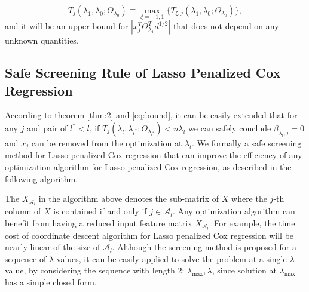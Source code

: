 \begin{equation}
    \label{eq:bound}
    T_j(\lambda_1,\lambda_0;\Theta_{\lambda_0})\equiv\max_{\xi=-1,1}\{T_{\xi,j}(\lambda_1,\lambda_0;\Theta_{\lambda_0})\},
\end{equation}
and it will be an upper bound for $|x_j^T\Theta^T_{\lambda_1}d^{1/2}|$ that does not depend on any unknown quantities. 

\subsection{Safe Screening Rule of Lasso Penalized Cox Regression}

According to theorem \ref{thm:2} and \eqref{eq:bound}, it can be easily extended that for any $j$ and pair of $l^*<l$, if $T_j(\lambda_{l},\lambda_{l^*};\Theta_{\lambda_{l^*}})<n\lambda_l$ we can safely conclude $\beta_{\lambda_l,j}=0$ and $x_j$ can be removed from the optimization at $\lambda_l$. We formally a safe screening method for Lasso penalized Cox regression that can improve the efficiency of any optimization algorithm for Lasso penalized Cox regression, as described in the following algorithm. 

\begin{algorithm}[H]

    
\end{algorithm}

The $X_{\mathcal{A}_l}$ in the algorithm above denotes the sub-matrix of $X$ where the $j$-th column of $X$ is contained if and only if $j\in{\mathcal{A}_l}$. Any optimization algorithm can benefit from having a reduced input feature matrix $X_{\mathcal{A}_l}$. For example, the time cost of coordinate descent algorithm for Lasso penalized Cox regression \citep{simon2011regularization} will be nearly linear of the size of $\mathcal{A}_l$. Although the screening method is proposed for a sequence of $\lambda$ values, it can be easily applied to solve the problem at a single $\lambda$ value, by considering the sequence with length 2: $\lambda_{\max},\lambda$, since solution at $\lambda_{\max}$ has a simple closed form.


